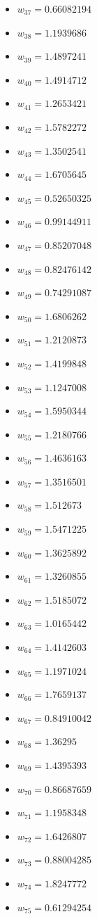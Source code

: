 \documentclass[11pt]{article}
\begin{document}
\begin{itemize}
\item $w_{37} = 0.66082194$
\item $w_{38} = 1.1939686$
\item $w_{39} = 1.4897241$
\item $w_{40} = 1.4914712$
\item $w_{41} = 1.2653421$
\item $w_{42} = 1.5782272$
\item $w_{43} = 1.3502541$
\item $w_{44} = 1.6705645$
\item $w_{45} = 0.52650325$
\item $w_{46} = 0.99144911$
\item $w_{47} = 0.85207048$
\item $w_{48} = 0.82476142$
\item $w_{49} = 0.74291087$
\item $w_{50} = 1.6806262$
\item $w_{51} = 1.2120873$
\item $w_{52} = 1.4199848$
\item $w_{53} = 1.1247008$
\item $w_{54} = 1.5950344$
\item $w_{55} = 1.2180766$
\item $w_{56} = 1.4636163$
\item $w_{57} = 1.3516501$
\item $w_{58} = 1.512673$
\item $w_{59} = 1.5471225$
\item $w_{60} = 1.3625892$
\item $w_{61} = 1.3260855$
\item $w_{62} = 1.5185072$
\item $w_{63} = 1.0165442$
\item $w_{64} = 1.4142603$
\item $w_{65} = 1.1971024$
\item $w_{66} = 1.7659137$
\item $w_{67} = 0.84910042$
\item $w_{68} = 1.36295$
\item $w_{69} = 1.4395393$
\item $w_{70} = 0.86687659$
\item $w_{71} = 1.1958348$
\item $w_{72} = 1.6426807$
\item $w_{73} = 0.88004285$
\item $w_{74} = 1.8247772$
\item $w_{75} = 0.61294254$

\end{itemize}
\end{document}
